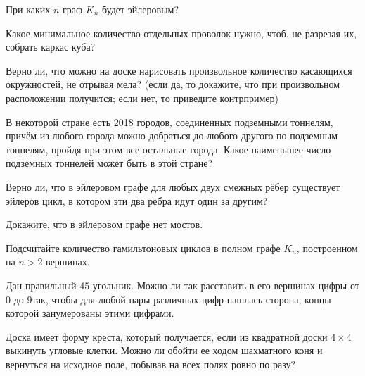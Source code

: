 \begin{exersize}
	При каких $n$ граф $K_n$ будет эйлеровым?
\end{exersize}

\begin{exersize}
	Какое минимальное количество отдельных проволок нужно, чтоб, не разрезая их, собрать каркас куба?
\end{exersize}

\begin{exersize}
	Верно ли, что можно на доске нарисовать произвольное количество касающихся окружностей, не отрывая мела? (если да, то докажите, что при произвольном расположении получится; если нет, то приведите контрпример)
\end{exersize}

\begin{exersize}
	В некоторой стране есть 2018 городов, соединенных подземными тоннелям, причём из любого города можно добраться до любого другого по подземным тоннелям, пройдя при этом все остальные города. Какое наименьшее число подземных тоннелей может быть в этой стране?
\end{exersize}
	
\begin{exersize}
	Верно ли, что в эйлеровом графе для любых двух смежных рёбер существует эйлеров цикл, в котором эти два ребра идут один за другим?
\end{exersize}

\begin{exersize}
	Докажите, что в эйлеровом графе нет мостов.
\end{exersize}

\begin{exersize}
	Подсчитайте количество гамильтоновых циклов в полном графе $K_n$, построенном на $n > 2$ вершинах.
\end{exersize}

\begin{exersize}
	Дан правильный $45$-угольник. Можно ли так расставить в его вершинах цифры от $0$ до $9$так, чтобы для любой пары различных цифр нашлась сторона, концы которой занумерованы этими цифрами.
\end{exersize}

\begin{exersize}
	Доска имеет форму креста, который получается, если из квадратной доски $4 \times 4$ выкинуть угловые клетки. Можно ли обойти ее ходом шахматного коня и вернуться на исходное поле, побывав на всех полях ровно по разу?
\end{exersize}

